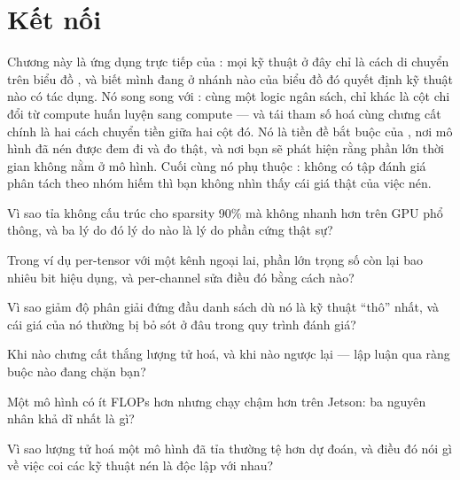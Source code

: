 \documentclass[../../deep_learning.tex]{subfiles}
\begin{document}
\section{Kết nối}
Chương này là ứng dụng trực tiếp của : mọi kỹ thuật ở đây chỉ là cách di chuyển trên biểu đồ , và biết mình đang ở nhánh nào của biểu đồ đó quyết định kỹ thuật nào có tác dụng. Nó song song với : cùng một logic ngân sách, chỉ khác là cột chi đổi từ compute huấn luyện sang compute  --- và tái tham số hoá cùng chưng cất chính là hai cách chuyển tiền giữa hai cột đó. Nó là tiền đề bắt buộc của , nơi mô hình đã nén được đem đi  và đo thật, và nơi bạn sẽ phát hiện rằng phần lớn thời gian không nằm ở mô hình. Cuối cùng nó phụ thuộc : không có tập đánh giá phân tách theo nhóm hiếm thì bạn không nhìn thấy cái giá thật của việc nén.

\begin{tukiem}
\item Vì sao tỉa không cấu trúc cho sparsity 90\% mà không nhanh hơn trên GPU phổ thông, và ba lý do đó lý do nào là lý do phần cứng thật sự?
\item Trong ví dụ per-tensor với một kênh ngoại lai, phần lớn trọng số còn lại bao nhiêu bit hiệu dụng, và per-channel sửa điều đó bằng cách nào?
\item Vì sao giảm độ phân giải đứng đầu danh sách dù nó là kỹ thuật ``thô'' nhất, và cái giá của nó thường bị bỏ sót ở đâu trong quy trình đánh giá?
\item Khi nào chưng cất thắng lượng tử hoá, và khi nào ngược lại --- lập luận qua ràng buộc nào đang chặn bạn?
\item Một mô hình có ít FLOPs hơn nhưng chạy chậm hơn trên Jetson: ba nguyên nhân khả dĩ nhất là gì?
\item Vì sao lượng tử hoá một mô hình đã tỉa thường tệ hơn dự đoán, và điều đó nói gì về việc coi các kỹ thuật nén là độc lập với nhau?
\end{tukiem}
\ifSubfilesClassLoaded{\printbibliography[title={Nguồn}]}{}
\end{document}

